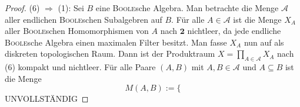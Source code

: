 \begin{proof}
  (6) $\Rightarrow$ (1):
  Sei $B$ eine \textsc{Boole}sche Algebra.
  Man betrachte die Menge $\mathcal{A}$ aller endlichen \textsc{Boole}schen Subalgebren auf $B$.
  Für alle $A \in \mathcal{A}$ ist die Menge $X_A$ aller \textsc{Boole}schen Homomorphismen von $A$ nach $\mathbf{2}$ nichtleer, da jede endliche \textsc{Boole}sche Algebra einen maximalen Filter besitzt.
  Man fasse $X_A$ nun auf als diskreten topologischen Raum.
  Dann ist der Produktraum $X = \prod_{A \in \mathcal{A}} X_A$ nach (6) kompakt und nichtleer.
  Für alle Paare $(A,B)$ mit $A,B \in \mathcal{A}$ und $A \subseteq B$ ist die Menge
  \begin{displaymath}
    M(A,B) := \{ 
  \end{displaymath}
  UNVOLLSTÄNDIG
\end{proof}


